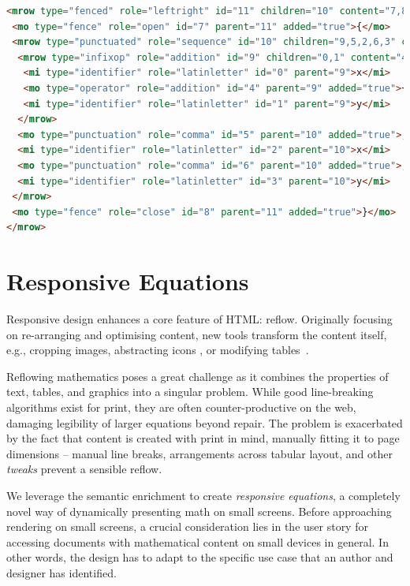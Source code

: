 \documentclass{llncs}
\begin{document}
\begin{minipage}{.8\linewidth}\scriptsize
\begin{lstlisting}[language=html]
<mrow type="fenced" role="leftright" id="11" children="10" content="7,8">
 <mo type="fence" role="open" id="7" parent="11" added="true">{</mo>
 <mrow type="punctuated" role="sequence" id="10" children="9,5,2,6,3" content="5,6" parent="11">
  <mrow type="infixop" role="addition" id="9" children="0,1" content="4" parent="10">
   <mi type="identifier" role="latinletter" id="0" parent="9">x</mi>
   <mo type="operator" role="addition" id="4" parent="9" added="true">+</mo>
   <mi type="identifier" role="latinletter" id="1" parent="9">y</mi>
  </mrow>
  <mo type="punctuation" role="comma" id="5" parent="10" added="true">,</mo>
  <mi type="identifier" role="latinletter" id="2" parent="10">x</mi>
  <mo type="punctuation" role="comma" id="6" parent="10" added="true">,</mo>
  <mi type="identifier" role="latinletter" id="3" parent="10">y</mi>
 </mrow>
 <mo type="fence" role="close" id="8" parent="11" added="true">}</mo>
</mrow>
\end{lstlisting}
\end{minipage}

\section{Responsive Equations}
\label{sec:responsive-equations}

Responsive design enhances a core feature of HTML: reflow. Originally focusing
on re-arranging and optimising content, new tools transform the content itself,
e.g., cropping images\cite{web1}, abstracting icons \cite{smashSvg}, or
modifying tables~\cite{zurbTable}.

Reflowing mathematics poses a great challenge as it combines the properties of
text, tables, and graphics into a singular problem. While good line-breaking
algorithms exist for print, they are often counter-productive on the web,
damaging legibility of larger equations beyond repair. The problem is
exacerbated by the fact that content is created with print in mind, manually
fitting it to page dimensions -- manual line breaks, arrangements across tabular
layout, and other \emph{tweaks} prevent a sensible reflow.

We leverage the semantic enrichment to create \emph{responsive equations}, a
completely novel way of dynamically presenting math on small screens. Before
approaching rendering on small screens, a crucial consideration lies in the 
user story for accessing documents with mathematical content on small 
devices in general. In other words, the design has to adapt to the specific use 
case that an author and designer has identified.
\end{document}
